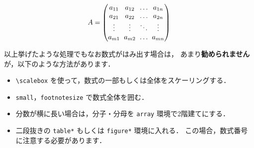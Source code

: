 \documentclass[technicalreport]{ieicej}
\begin{document}
\begin{equation}
 \arraycolsep3pt
 A = \begin{pmatrix}
      a_{11} & a_{12} & \ldots & a_{1n} \\
      a_{21} & a_{22} & \ldots & a_{2n} \\
      \vdots & \vdots & \ddots & \vdots \\
      a_{m1} & a_{m2} & \ldots & a_{mn} 
     \end{pmatrix}
\end{equation}

以上挙げたような処理でもなお数式がはみ出す場合は，
あまり{\bfseries 勧められません}が，以下のような方法があります．
\begin{itemize}
\item 
\verb/\scalebox/ を使って，数式の一部もしくは全体をスケーリングする．
\item 
\texttt{small}，\texttt{footnotesize} で数式全体を囲む．
\item 
分数が横に長い場合は，分子・分母を \texttt{array} 環境で2階建てにする．
\item 
二段抜きの \texttt{table*} もしくは \texttt{figure*} 環境に入れる．
この場合，数式番号に注意する必要があります．
\end{itemize}

\end{document}
